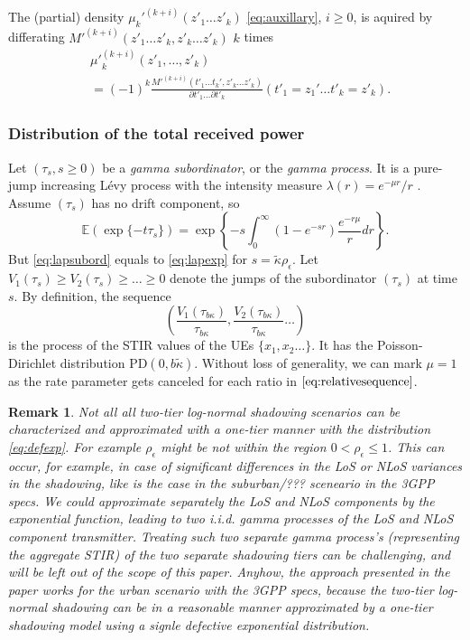 \documentclass[lettersize,journal]{IEEEtran}
\newtheorem*{remark}{Remark}
\begin{document}
The (partial) density $\mu_k'^{(k+i)}(z'_1 \dots z'_k)$ \eqref{eq:auxillary}, $i \geq 0$, is aquired by differating $M'^{(k+i)}(z'_1 \dots z'_k,z'_k\dots z'_k)$ $k$ times
\begin{align}
  \label{eq:differatemomentmeasure}
  &{\mu'}_k^{(k+i)}(z'_1,\dots,z'_k) \nonumber\\
  &= (-1)^k \frac{M'^{(k+i)}(t'_1\dots t_k',z'_k\dots z'_k)}{\partial t'_1 \dots \partial t'_k}(t'_1=z_1'\dots t'_k=z'_k).
\end{align}



 
\subsubsection{Distribution of the total received power}




Let $(\tau_s, s\geq 0)$ be a \textit{gamma subordinator}, or the \textit{gamma process}. It is a pure-jump increasing Lévy process with the intensity measure $\lambda(r) = e^{-\mu r}/r$ . Assume $(\tau_s)$ has no drift component, so
\begin{equation}
  \label{eq:lapsubord}
  \mathbb{E}(\exp\{-t \tau_s\}) = \exp\left\{-s \int_0^{\infty}(1-e^{-s r})\frac{e^{-r\mu}}{r} dr \right\}.
\end{equation}
But \eqref{eq:lapsubord} equals to \eqref{eq:lapexp} for $s=\tilde{\kappa}\rho_{\epsilon} $. Let $V_1(\tau_s) \geq V_2(\tau_s)\geq \dots \geq 0 $ denote the jumps of the subordinator $(\tau_s)$ at time $s$. By definition, the sequence
\begin{equation}
  \label{eq:relativesequence}
  \left(\frac{V_1(\tau_{b\kappa})}{\tau_{b\kappa}},\frac{V_2(\tau_{b\kappa})}{\tau_{b\kappa}} \dots \right)
\end{equation}
is the process of the STIR values of the UEs $\{x_1,x_2 \dots\}$. It has the Poisson-Dirichlet distribution PD$(0, b \tilde{\kappa})$. Without loss of generality, we can mark $\mu=1$ as the rate parameter gets canceled for each ratio in $\eqref{eq:relativesequence}$.

\begin{remark}
  Not all all two-tier log-normal shadowing scenarios can be characterized and approximated with a one-tier manner with the distribution \eqref{eq:defexp}. For example $\rho_{\epsilon}$ might be not within the region $0<\rho_{\epsilon} \leq 1$. This can occur, for example, in case of significant differences in the LoS or NLoS variances in the shadowing, like is the case in the suburban/??? sceneario in the 3GPP specs. We could approximate separately the LoS and NLoS components by the exponential function, leading to two i.i.d. gamma processes of the LoS and NLoS component transmitter. Treating such two separate gamma process's (representing the aggregate STIR) of the two separate shadowing tiers can be challenging, and will be left out of the scope of this paper. Anyhow, the approach presented in the paper works for the urban scenario with the 3GPP specs, because the two-tier log-normal shadowing can be in a reasonable manner approximated by a one-tier shadowing model using a signle defective exponential distribution.
\end{remark}
\end{document}
